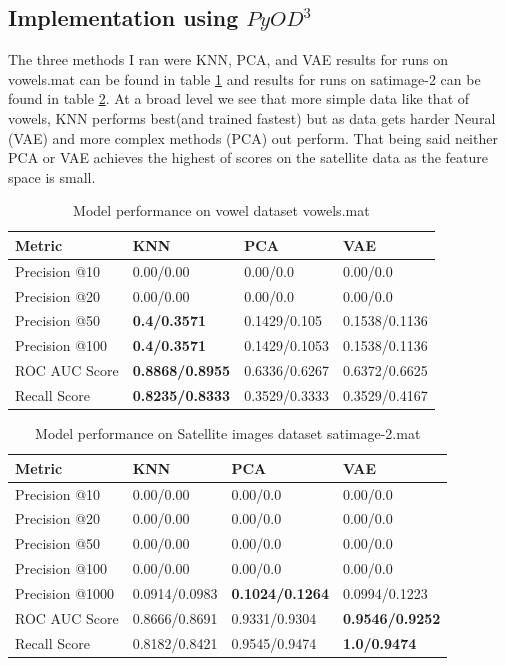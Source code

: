 \documentclass[11pt]{article}
\begin{document}
\subsection{Implementation using $PyOD^3$}
The three methods I ran were KNN, PCA, and VAE results for runs on vowels.mat can be found in table \ref{tab:vowels} and results for runs on satimage-2 can be found in table \ref{tab:satimage}. At a broad level we see that more simple data like that of vowels, KNN performs best(and trained fastest) but as data gets harder Neural (VAE) and more complex methods (PCA) out perform. That being said neither PCA or VAE achieves the highest of scores on the satellite data as the feature space is small. 
\begin{table}[]
\begin{tabular}{|l|l|l|l|} \hline
Metric        & KNN & PCA     & VAE  \\ \hline
Precision @10 & 0.00/0.00       & 0.00/0.0    &  0.00/0.0   \\ \hline
Precision @20 & 0.00/0.00       & 0.00/0.0    &  0.00/0.0     \\ \hline
Precision @50 & \textbf{0.4/0.3571}      & 0.1429/0.105 & 0.1538/0.1136 \\ \hline
Precision @100 & \textbf{0.4/0.3571}      & 0.1429/0.1053 & 0.1538/0.1136 \\ \hline
ROC AUC Score & \textbf{0.8868/0.8955}   & 0.6336/0.6267 & 0.6372/0.6625 \\ \hline
Recall Score  & \textbf{0.8235/0.8333}   & 0.3529/0.3333 & 0.3529/0.4167 \\ \hline
\end{tabular}
\caption{Model performance on vowel dataset vowels.mat}
\label{tab:vowels}
\end{table}
\begin{table}[]
\begin{tabular}{|l|l|l|l|}\hline
Metric        & KNN & PCA     & VAE  \\ \hline
Precision @10 & 0.00/0.00       & 0.00/0.0     &  0.00/0.0   \\ \hline
Precision @20 & 0.00/0.00       & 0.00/0.0     &  0.00/0.0   \\ \hline
Precision @50 & 0.00/0.00       & 0.00/0.0     &  0.00/0.0   \\ \hline
Precision @100 & 0.00/0.00      & 0.00/0.0     &  0.00/0.0   \\ \hline
Precision @1000 & 0.0914/0.0983 & \textbf{0.1024/0.1264} & 0.0994/0.1223  \\ \hline
ROC AUC Score & 0.8666/0.8691   & 0.9331/0.9304& \textbf{0.9546/0.9252} \\ \hline
Recall Score  & 0.8182/0.8421   & 0.9545/0.9474& \textbf{1.0/0.9474} \\ \hline
\end{tabular}
\caption{Model performance on Satellite images dataset satimage-2.mat}
\label{tab:satimage}
\end{table}
\end{document}
